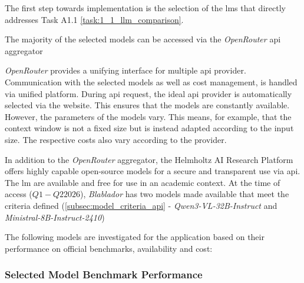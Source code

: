 The first step towards implementation is the selection of the \acp{lm} that directly addresses Task A1.1 \cref{task:1_1_llm_comparison}.

The majority of the selected models can be accessed via the \textit{OpenRouter} \ac{api} aggregator

\textit{OpenRouter} provides a unifying interface for multiple \ac{api} provider.
Communication with the selected models as well as cost management, is handled via unified platform.
During \ac{api} request, the ideal \ac{api} provider is automatically selected via the website.
This ensures that the models are constantly available.
However, the parameters of the models vary.
This means, for example, that the context window is not a fixed size but is instead adapted according to the input size.
The respective costs also vary according to the provider.

In addition to the \textit{OpenRouter} aggregator, the Helmholtz AI Research Platform offers highly capable open-source models for a secure and transparent use via \ac{api}.
The \ac{lm} are available and free for use in an academic context.
At the time of access ($Q1-Q2 2026$), \textit{Blablador} has two models made available that meet the criteria defined (\cref{subsec:model_criteria_api} - \textit{Qwen3-VL-32B-Instruct} and \textit{Ministral-8B-Instruct-2410})

The following models are investigated for the application based on their performance on official benchmarks, availability and cost:
%
\subsubsection{Selected Model Benchmark Performance}\label{subsec:model_benchmarks_api} 

